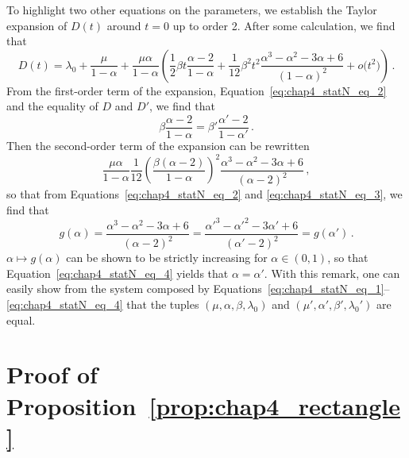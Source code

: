 \begin{subappendices}
To highlight two other equations on the parameters, we establish the Taylor expansion of $D(t)$ around $t = 0$ up to order 2.
After some calculation, we find that 
\begin{equation*}
  D(t) = \lambda_0 + \frac{\mu}{1-\alpha} + \frac{\mu\alpha}{1-\alpha} \left( \frac{1}{2} \beta t \frac{\alpha-2}{1-\alpha} + \frac{1}{12} \beta^2 t^2 \frac{\alpha^3 - \alpha^2 - 3\alpha + 6}{(1-\alpha)^2} + o\bigl(t^2\bigr) \right) \,.
\end{equation*}
From the first-order term of the expansion, Equation~\eqref{eq:chap4_statN_eq_2} and the equality of $D$ and $D'$, we find that
\begin{equation}\label{eq:chap4_statN_eq_3}
  \beta \frac{\alpha - 2}{1 - \alpha} = \beta' \frac{\alpha' - 2}{1 - \alpha'} \,.
\end{equation}
Then the second-order term of the expansion can be rewritten
\begin{equation*}
  \frac{\mu\alpha}{1-\alpha} \frac{1}{12} \left( \frac{\beta(\alpha-2)}{1-\alpha} \right)^2 \frac{\alpha^3 - \alpha^2 - 3\alpha + 6}{(\alpha-2)^2} \,,
\end{equation*}
so that from Equations~\eqref{eq:chap4_statN_eq_2} and \eqref{eq:chap4_statN_eq_3}, we find that 
\begin{equation}\label{eq:chap4_statN_eq_4}
  g(\alpha) = \frac{\alpha^3 - \alpha^2 - 3\alpha + 6}{(\alpha-2)^2} = \frac{\alpha'^3 - \alpha'^2 - 3\alpha' + 6}{(\alpha'-2)^2} = g(\alpha') \,.
\end{equation}
$\alpha \mapsto g(\alpha)$ can be shown to be strictly increasing for $\alpha \in (0, 1)$, so that Equation~\eqref{eq:chap4_statN_eq_4} yields that $\alpha = \alpha'$.
With this remark, one can easily show from the system composed by Equations~\eqref{eq:chap4_statN_eq_1}--\eqref{eq:chap4_statN_eq_4} that the tuples $(\mu, \alpha, \beta, \lambda_0)$ and $(\mu', \alpha', \beta', \lambda_0')$ are equal.


\section{Proof of Proposition~\ref{prop:chap4_rectangle}}
\label{app:felix3}


\end{subappendices}
